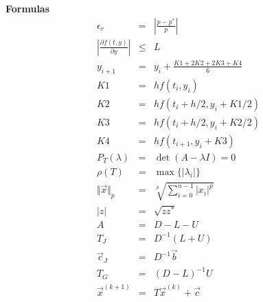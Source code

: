 \documentclass[12pt]{article}
\begin{document}
  \textbf{Formulas}
%
  \begin{eqnarray*}
  \epsilon_r & = & \left\vert \frac{p - p^*}{p} \right\vert \\
  \left\vert \frac{\partial f(t, y)}{\partial y} \right\vert & \leq & L \\
  y_{i+1} & = & y_i + \frac{K1 + 2K2 + 2K3 + K4}{6} \\
  K1 & = & hf(t_i, y_i) \\
  K2 & = & hf(t_i + h/2, y_i + K1/2) \\
  K3 & = & hf(t_i + h/2, y_i + K2/2) \\
  K4 & = & hf(t_{i+1}, y_i + K3)\\
%
%
  P_{T}(\lambda) & = & \det(A-\lambda I) = 0 \\
  \rho(T) & = & \max \lbrace \vert \lambda_i \vert \rbrace \\
  \Vert \vec{x} \Vert_{p} & = & \sqrt[p]{\sum_{i=0}^{n-1} \vert x_i \vert^p} \\
  \left\vert z \right\vert & = & \sqrt{zz^*} \\
  A & = & D - L - U \\
  T_J & = & D^{-1}(L+U) \\
  \vec{c}_J & = & D^{-1}\vec{b} \\
  T_G & = & {(D-L)}^{-1}U \\
  \vec{x}^{(k+1)} & = & T\vec{x}^{(k)} + \vec{c}
  \end{eqnarray*}
\end{document}

